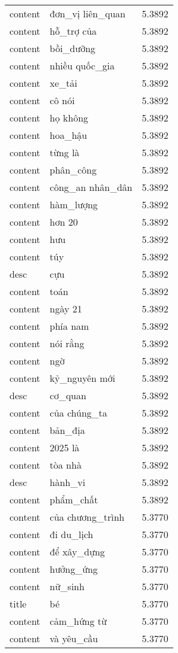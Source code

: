 \documentclass{article}
\begin{document}
\begin{tabular}{lll}
content & đơn\_vị liên\_quan & 5.3892\\
content & hỗ\_trợ của & 5.3892\\
content & bồi\_dưỡng & 5.3892\\
content & nhiều quốc\_gia & 5.3892\\
content & xe\_tải & 5.3892\\
content & cô nói & 5.3892\\
content & họ không & 5.3892\\
content & hoa\_hậu & 5.3892\\
content & từng là & 5.3892\\
content & phân\_công & 5.3892\\
content & công\_an nhân\_dân & 5.3892\\
content & hàm\_lượng & 5.3892\\
content & hơn 20 & 5.3892\\
content & hưu & 5.3892\\
content & túy & 5.3892\\
desc & cựu & 5.3892\\
content & toán & 5.3892\\
content & ngày 21 & 5.3892\\
content & phía nam & 5.3892\\
content & nói rằng & 5.3892\\
content & ngờ & 5.3892\\
content & kỷ\_nguyên mới & 5.3892\\
desc & cơ\_quan & 5.3892\\
content & của chúng\_ta & 5.3892\\
content & bản\_địa & 5.3892\\
content & 2025 là & 5.3892\\
content & tòa nhà & 5.3892\\
desc & hành\_vi & 5.3892\\
content & phẩm\_chất & 5.3892\\
content & của chương\_trình & 5.3770\\
content & đi du\_lịch & 5.3770\\
content & để xây\_dựng & 5.3770\\
content & hưởng\_ứng & 5.3770\\
content & nữ\_sinh & 5.3770\\
title & bé & 5.3770\\
content & cảm\_hứng từ & 5.3770\\
content & và yêu\_cầu & 5.3770\\

\end{tabular}
\end{document}
